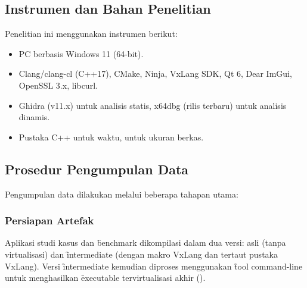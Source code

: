 \subsection{Instrumen dan Bahan Penelitian}
Penelitian ini menggunakan instrumen berikut:
\begin{itemize}
    \item {} PC berbasis Windows 11 (64-bit).
    \item {} Clang/clang-cl (C++17), CMake, Ninja, VxLang SDK, Qt 6, Dear ImGui, OpenSSL 3.x, libcurl.
    \item {} Ghidra (v11.x) untuk analisis statis, x64dbg (rilis terbaru) untuk analisis dinamis.
    \item {} Pustaka C++  untuk waktu,  untuk ukuran berkas.
\end{itemize}

\subsection{Prosedur Pengumpulan Data}
Pengumpulan data dilakukan melalui beberapa tahapan utama:

\subsubsection{Persiapan Artefak}
Aplikasi studi kasus dan \f{benchmark} dikompilasi dalam dua versi: asli (tanpa virtualisasi) dan \f{intermediate} (dengan makro VxLang dan tertaut pustaka VxLang). Versi \f{intermediate} kemudian diproses menggunakan \f{tool command-line}  untuk menghasilkan \f{executable} tervirtualisasi akhir ().

